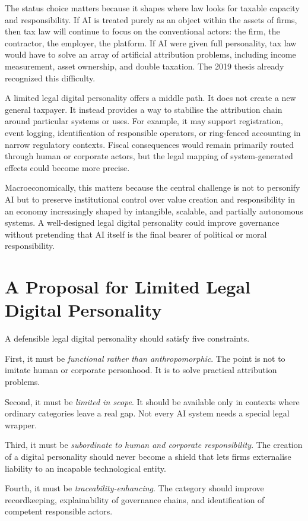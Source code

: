 \documentclass[11pt]{article}
\begin{document}
The status choice matters because it shapes where law looks for taxable capacity and responsibility. If AI is treated purely as an object within the assets of firms, then tax law will continue to focus on the conventional actors: the firm, the contractor, the employer, the platform. If AI were given full personality, tax law would have to solve an array of artificial attribution problems, including income measurement, asset ownership, and double taxation. The 2019 thesis already recognized this difficulty.

A limited legal digital personality offers a middle path. It does not create a new general taxpayer. It instead provides a way to stabilise the attribution chain around particular systems or uses. For example, it may support registration, event logging, identification of responsible operators, or ring-fenced accounting in narrow regulatory contexts. Fiscal consequences would remain primarily routed through human or corporate actors, but the legal mapping of system-generated effects could become more precise.

Macroeconomically, this matters because the central challenge is not to personify AI but to preserve institutional control over value creation and responsibility in an economy increasingly shaped by intangible, scalable, and partially autonomous systems. A well-designed legal digital personality could improve governance without pretending that AI itself is the final bearer of political or moral responsibility.

\section{A Proposal for Limited Legal Digital Personality}
A defensible legal digital personality should satisfy five constraints.

First, it must be \emph{functional rather than anthropomorphic}. The point is not to imitate human or corporate personhood. It is to solve practical attribution problems.

Second, it must be \emph{limited in scope}. It should be available only in contexts where ordinary categories leave a real gap. Not every AI system needs a special legal wrapper.

Third, it must be \emph{subordinate to human and corporate responsibility}. The creation of a digital personality should never become a shield that lets firms externalise liability to an incapable technological entity.

Fourth, it must be \emph{traceability-enhancing}. The category should improve recordkeeping, explainability of governance chains, and identification of competent responsible actors.
\end{document}
